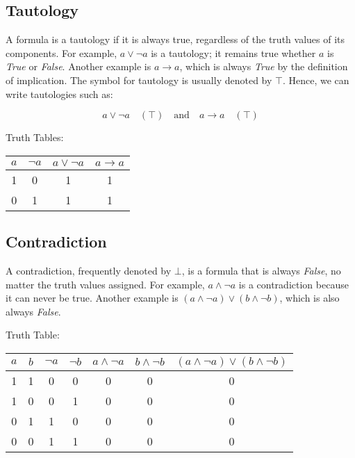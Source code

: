 \documentclass[12pt,a4paper,openany]{article}
\begin{document}
\subsection{Tautology}\label{tautology}

A formula is a tautology if it is always true, regardless of the truth
values of its components. For example, \(a \lor \neg a\) is a tautology;
it remains true whether \(a\) is \emph{True} or \emph{False}. Another
example is \(a \to a\), which is always \emph{True} by the definition of
implication. The symbol for tautology is usually denoted by \(\top\).
Hence, we can write tautologies such as:

\[
a \lor \neg a \quad (\top) \quad \text{and} \quad a \to a \quad (\top)
\]

Truth Tables:

\begin{center}
\begin{tabular}{|c|c|c|c|}
\hline
\(a\) & \(\neg a\) & \(a \lor \neg a\) & \(a \to a\) \\
\hline
1 & 0 & 1 & 1 \\
0 & 1 & 1 & 1 \\
\hline
\end{tabular}
\end{center}

\subsection{Contradiction}\label{contradiction}

A contradiction, frequently denoted by \(\bot\), is a formula that is
always \emph{False}, no matter the truth values assigned. For example,
\(a \land \neg a\) is a contradiction because it can never be true.
Another example is \((a \land \neg a) \lor (b \land \neg b)\), which is
also always \emph{False}.

Truth Table:

\begin{center}
\begin{tabular}{|c|c|c|c|c|c|c|}
\hline
\(a\) & \(b\) & \(\neg a\) & \(\neg b\) & \(a \land \neg a\) & \(b \land \neg b\) & \((a \land \neg a) \lor (b \land \neg b)\) \\
\hline
1 & 1 & 0 & 0 & 0 & 0 & 0 \\
1 & 0 & 0 & 1 & 0 & 0 & 0 \\
0 & 1 & 1 & 0 & 0 & 0 & 0 \\
0 & 0 & 1 & 1 & 0 & 0 & 0 \\
\hline
\end{tabular}
\end{center}
\end{document}
